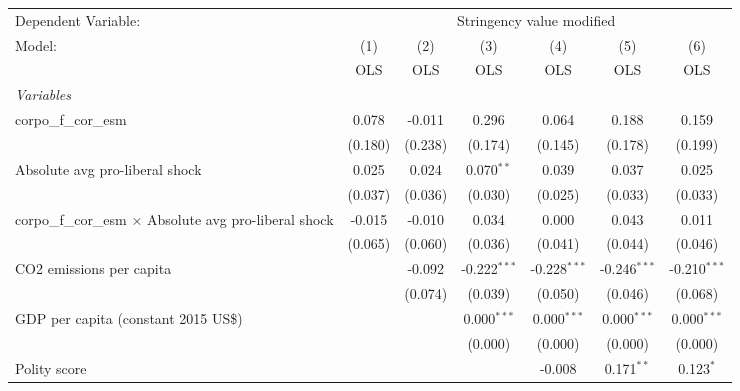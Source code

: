 
\begingroup
\centering
\begin{tabular}{lcccccc}
   \toprule
   Dependent Variable: & \multicolumn{6}{c}{Stringency value modified}\\
   Model:                                                         & (1)     & (2)     & (3)            & (4)            & (5)            & (6)\\  
                                                                  &  OLS    & OLS     & OLS            & OLS            & OLS            & OLS\\  
   \midrule
   \emph{Variables}\\
   corpo\_f\_cor\_esm                                             & 0.078   & -0.011  & 0.296          & 0.064          & 0.188          & 0.159\\   
                                                                  & (0.180) & (0.238) & (0.174)        & (0.145)        & (0.178)        & (0.199)\\   
   Absolute avg pro-liberal shock                                 & 0.025   & 0.024   & 0.070$^{**}$   & 0.039          & 0.037          & 0.025\\   
                                                                  & (0.037) & (0.036) & (0.030)        & (0.025)        & (0.033)        & (0.033)\\   
   corpo\_f\_cor\_esm $\times$ Absolute avg pro-liberal shock     & -0.015  & -0.010  & 0.034          & 0.000          & 0.043          & 0.011\\   
                                                                  & (0.065) & (0.060) & (0.036)        & (0.041)        & (0.044)        & (0.046)\\   
   CO2 emissions per capita                                       &         & -0.092  & -0.222$^{***}$ & -0.228$^{***}$ & -0.246$^{***}$ & -0.210$^{***}$\\   
                                                                  &         & (0.074) & (0.039)        & (0.050)        & (0.046)        & (0.068)\\   
   GDP per capita (constant 2015 US\$)                            &         &         & 0.000$^{***}$  & 0.000$^{***}$  & 0.000$^{***}$  & 0.000$^{***}$\\   
                                                                  &         &         & (0.000)        & (0.000)        & (0.000)        & (0.000)\\   
   Polity score                                                   &         &         &                & -0.008         & 0.171$^{**}$   & 0.123$^{*}$\\   

\end{tabular}
